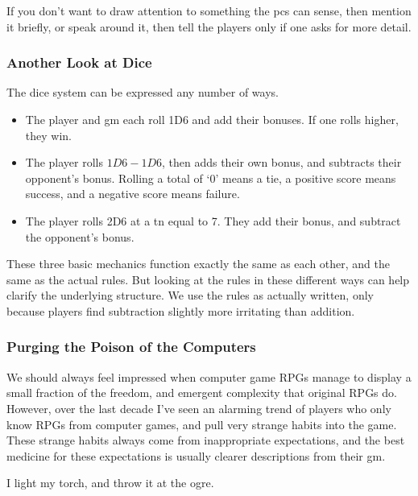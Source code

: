 \begin{multicols}{2}
If you don't want to draw attention to something the \glspl{pc} can sense, then mention it briefly, or speak around it, then tell the players only if one asks for more detail.

\subsubsection{Another Look at Dice}

The dice system can be expressed any number of ways.

\begin{itemize}

  \item
  The player and \gls{gm} each roll 1D6 and add their bonuses.
  If one rolls higher, they win.
  \item
  The player rolls $1D6-1D6$, then adds their own bonus, and subtracts their opponent's bonus.
  Rolling a total of `0' means a tie, a positive score means success, and a negative score means failure.
  \item
  The player rolls 2D6 at a \gls{tn} equal to 7.
  They add their bonus, and subtract the opponent's bonus.

\end{itemize}

\noindent
These three basic mechanics function exactly the same as each other, and the same as the actual rules.
But looking at the rules in these different ways can help clarify the underlying structure.
We use the rules as actually written, only because players find subtraction slightly more irritating than addition.

\subsubsection{Purging the Poison of the Computers}

We should always feel impressed when computer game RPGs manage to display a small fraction of the freedom, and emergent complexity that original RPGs do.
However, over the last decade I've seen an alarming trend of players who only know RPGs from computer games, and pull very strange habits into the game.
These strange habits always come from inappropriate expectations, and the best medicine for these expectations is usually clearer descriptions from their \gls{gm}.

\begin{boxtext}
  I light my torch, and throw it at the ogre.
\end{boxtext}


\end{multicols}
